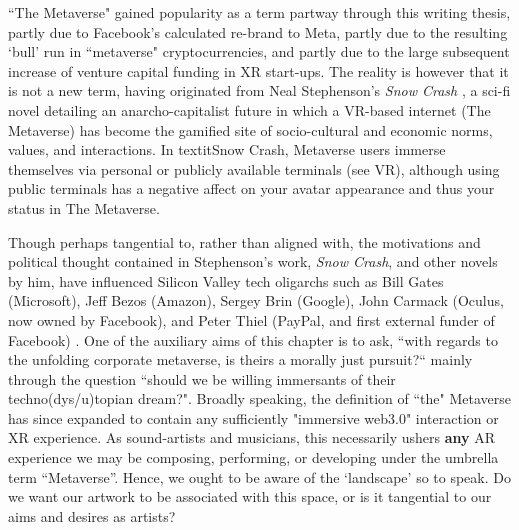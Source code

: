 ``The Metaverse" gained popularity as a term partway through this writing thesis, partly due to Facebook's calculated re-brand to Meta, partly due to the resulting `bull' run in ``metaverse" cryptocurrencies, and partly due to the large subsequent increase of venture capital funding in XR start-ups. The reality is however that it is not a new term, having originated from Neal Stephenson's \textit{Snow Crash} \citep[]{stephenson1992}, a sci-fi novel detailing an anarcho-capitalist future in which a VR-based internet (The Metaverse) has become the gamified site of socio-cultural and economic norms, values, and interactions. In textit{Snow Crash}, Metaverse users immerse themselves via personal or publicly available terminals (see VR), although using public terminals has a negative affect on your avatar appearance and thus your status in The Metaverse.

Though perhaps tangential to, rather than aligned with, the motivations and political thought contained in Stephenson's work, \textit{Snow Crash}, and other novels by him, have influenced Silicon Valley tech oligarchs such as Bill Gates (Microsoft), Jeff Bezos (Amazon), Sergey Brin (Google), John Carmack (Oculus, now owned by Facebook), and Peter Thiel (PayPal, and first external funder of Facebook) \citep[]{rogers2021}. One of the auxiliary aims of this chapter is to ask, ``with regards to the unfolding corporate metaverse, is theirs a morally just pursuit?`` mainly through the question ``should we be willing immersants of their techno(dys/u)topian dream?". Broadly speaking, the definition of ``the" Metaverse has since expanded to contain any sufficiently "immersive web3.0" interaction or XR experience. As sound-artists and musicians, this necessarily ushers \textbf{any} AR experience we may be composing, performing, or developing under the umbrella term ``Metaverse''. Hence, we ought to be aware of the `landscape' so to speak. Do we want our artwork to be associated with this space, or is it tangential to our aims and desires as artists?

